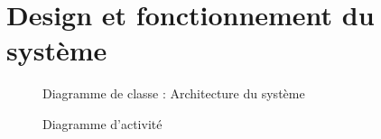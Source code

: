 \documentclass[a4paper,11pt]{report}
\begin{document}
\section{Design et fonctionnement du système}
\begin{figure}[ht]
    \caption{Diagramme de classe : Architecture du système}
\end{figure}
\begin{figure}[ht]
    \caption{Diagramme d'activité}
\end{figure}
\end{document}
